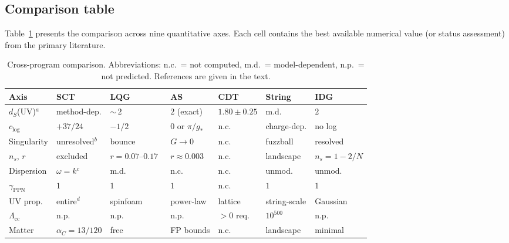 \documentclass[12pt,a4paper]{article}
\theoremstyle{plain}
\theoremstyle{definition}
\theoremstyle{remark}
\begin{document}
\subsection{Comparison table}
\label{sec:table}

Table~\ref{tab:comparison} presents the comparison across nine
quantitative axes.  Each cell contains the best available
numerical value (or status assessment) from the primary
literature.

\begin{table}[ht]
\centering
\caption{Cross-program comparison.  Abbreviations: n.c.\ = not
computed, m.d.\ = model-dependent, n.p.\ = not predicted.
References are given in the text.}
\label{tab:comparison}
\small
\begin{tabular}{p{2cm}p{1.7cm}p{1.7cm}p{1.7cm}p{1.4cm}p{1.7cm}p{1.7cm}}
\toprule
Axis & SCT & LQG & AS & CDT & String & IDG \\
\midrule
$d_S$(UV)${}^a$ &
  method-dep. &
  ${\sim}\,2$ &
  $2$ (exact) &
  $1.80\pm0.25$ &
  m.d. &
  $2$ \\[4pt]
$c_{\log}$ &
  $+37/24$ &
  $-1/2$ &
  $0$ or $\pi/g_*$ &
  n.c. &
  charge-dep. &
  no log \\[4pt]
Singularity &
  unresolved${}^b$ &
  bounce &
  $G \to 0$ &
  n.c. &
  fuzzball &
  resolved \\[4pt]
$n_s$, $r$ &
  excluded &
  $r = 0.07$--$0.17$~\cite{AguloMorris:2015} &
  $r \approx 0.003$ &
  n.c. &
  landscape &
  $n_s = 1{-}2/N$ \\[4pt]
Dispersion &
  $\omega = k$${}^c$ &
  m.d. &
  n.c. &
  n.c. &
  unmod. &
  unmod. \\[4pt]
$\gamma_{\text{PPN}}$ &
  $1$ &
  $1$ &
  $1$ &
  n.c. &
  $1$ &
  $1$ \\[4pt]
UV prop. &
  entire${}^d$ &
  spinfoam &
  power-law &
  lattice &
  string-scale &
  Gaussian \\[4pt]
$\Lambda_{\text{cc}}$ &
  n.p. &
  n.p. &
  n.p. &
  $>0$ req. &
  $10^{500}$ &
  n.p. \\[4pt]
Matter &
  $\alpha_C = 13/120$ &
  free &
  FP bounds &
  n.c. &
  landscape &
  minimal \\
\bottomrule
\end{tabular}

\smallskip{}
\end{table}
\end{document}
